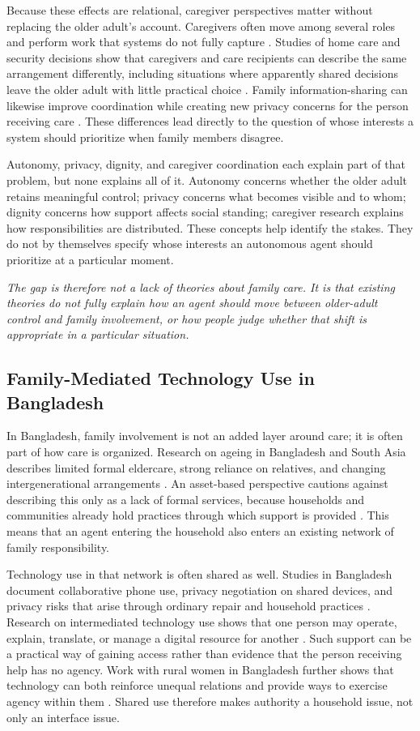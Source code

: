 Because these effects are relational, caregiver perspectives matter without replacing the older adult's account. Caregivers often move among several roles and perform work that systems do not fully capture \cite{47}. Studies of home care and security decisions show that caregivers and care recipients can describe the same arrangement differently, including situations where apparently shared decisions leave the older adult with little practical choice \cite{24,56,65,76}. Family information-sharing can likewise improve coordination while creating new privacy concerns for the person receiving care \cite{115}. These differences lead directly to the question of whose interests a system should prioritize when family members disagree.

Autonomy, privacy, dignity, and caregiver coordination each explain part of that problem, but none explains all of it. Autonomy concerns whether the older adult retains meaningful control; privacy concerns what becomes visible and to whom; dignity concerns how support affects social standing; caregiver research explains how responsibilities are distributed. These concepts help identify the stakes. They do not by themselves specify whose interests an autonomous agent should prioritize at a particular moment.

\textit{The gap is therefore not a lack of theories about family care. It is that existing theories do not fully explain how an agent should move between older-adult control and family involvement, or how people judge whether that shift is appropriate in a particular situation.}

\subsection{Family-Mediated Technology Use in Bangladesh}

In Bangladesh, family involvement is not an added layer around care; it is often part of how care is organized. Research on ageing in Bangladesh and South Asia describes limited formal eldercare, strong reliance on relatives, and changing intergenerational arrangements \cite{5,12,37,51,77,90}. An asset-based perspective cautions against describing this only as a lack of formal services, because households and communities already hold practices through which support is provided \cite{60}. This means that an agent entering the household also enters an existing network of family responsibility.

Technology use in that network is often shared as well. Studies in Bangladesh document collaborative phone use, privacy negotiation on shared devices, and privacy risks that arise through ordinary repair and household practices \cite{1,2,3,4}. Research on intermediated technology use shows that one person may operate, explain, translate, or manage a digital resource for another \cite{33,98}. Such support can be a practical way of gaining access rather than evidence that the person receiving help has no agency. Work with rural women in Bangladesh further shows that technology can both reinforce unequal relations and provide ways to exercise agency within them \cite{110}. Shared use therefore makes authority a household issue, not only an interface issue.

